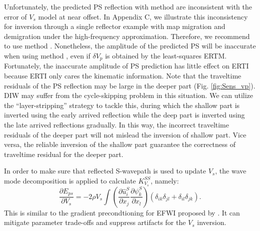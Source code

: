 \documentclass[extra,mreferee]{gji}
\newcommand{\Rome}[1]{{\bf\uppercase\expandafter{\romannumeral #1\relax}}}
\begin{document}
Unfortunately, the predicted PS reflection with method \Rome{1} are
inconsistent with the error of $V_s$ model at near offset. 
In Appendix C, we illustrate this inconsistency for inversion through a single reflector
example with
map migration and demigration under the high-frequency approximation.
Therefore, we recommend to use method \Rome{2}.
Nonetheless, the amplitude of the predicted PS will be inaccurate when using 
method \Rome{2}, even if $\delta V_p$ is obtained by the
least-squares ERTM. 
Fortunately, the inaccurate amplitude of PS prediction has little effect on ERTI because ERTI only
cares the kinematic information.
Note that 
the traveltime residuals of the PS reflection may be 
large in the deeper part (Fig. \ref{fig:Sens_vp}). DIW may suffer from the cycle-skipping problem in this
situation. We can utilize the ``layer-stripping'' strategy to tackle this, during which the shallow part is
inverted using the early arrived reflection while the deep part is inverted using the late
arrived reflections gradually. In this way, the incorrect traveltime residuals of the deeper part will not
mislead the inversion of shallow part. Vice versa, the reliable inversion of the shallow part
guarantee
the correctness of traveltime residual for the deeper part.

In order to make sure that reflected S-wavepath is used to update $V_s$, the wave mode decomposition 
is applied to calculate $K^{SS}_{V_s}$, namely:
\begin{equation}
	\frac{\partial E_{ps}}{\partial V_s}=-2\rho V_s
	\int (\frac{\partial \hat{u}^S_{i}}{\partial
    x_j}\frac{\partial \psi^S_{k}}{\partial x_l})
	(\delta_{ik}\delta_{jl}+
	\delta_{il}\delta_{jk}).
    \label{eq:GradientVel_MD}
\end{equation}
This is similar to the gradient precondtioning for EFWI proposed by \cite{WangEtAl2017}. 
It can mitigate parameter trade-offs and suppress artifacts for the
$V_s$ inversion.
\end{document}
